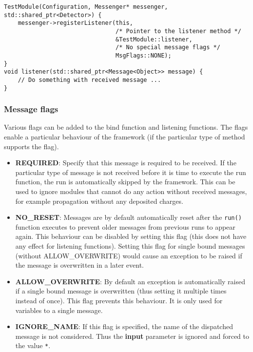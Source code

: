 \begin{enumerate}
\begin{verbatim}
TestModule(Configuration, Messenger* messenger, std::shared_ptr<Detector>) {
    messenger->registerListener(this,
                                /* Pointer to the listener method */
                                &TestModule::listener,
                                /* No special message flags */
                                MsgFlags::NONE);
}
void listener(std::shared_ptr<Message<Object>> message) {
    // Do something with received message ...
}
\end{verbatim}
\end{enumerate}

\subsubsection{Message flags}
Various flags can be added to the bind function and listening functions. The flags enable a particular behaviour of the framework (if the particular type of method supports the flag).
\begin{itemize}
\item \textbf{REQUIRED}: Specify that this message is required to be received. If the particular type of message is not received before it is time to execute the run function, the run is automatically skipped by the framework. This can be used to ignore modules that cannot do any action without received messages, for example propagation without any deposited charges.
\item \textbf{NO\_RESET}: Messages are by default automatically reset after the \texttt{run()} function executes to prevent older messages from previous runs to appear again. This behaviour can be disabled by setting this flag (this does not have any effect for listening functions). Setting this flag for single bound messages (without ALLOW\_OVERWRITE) would cause an exception to be raised if the message is overwritten in a later event.
\item \textbf{ALLOW\_OVERWRITE}: By default an exception is automatically raised if a single bound message is overwritten (thus setting it multiple times instead of once). This flag prevents this behaviour. It is only used for variables to a single message.
\item \textbf{IGNORE\_NAME}: If this flag is specified, the name of the dispatched message is not considered. Thus the \textbf{input} parameter is ignored and forced to the value \texttt{*}. 
\end{itemize}

